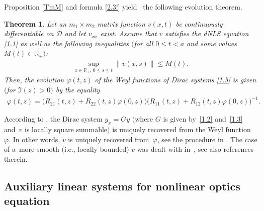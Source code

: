 \documentclass[pdftex]{sigma}
\newtheorem{Theorem}{Theorem}[section]
\def\vp{\varphi}
\def\BR{{\mathbb R}}
\newcommand{\cD}{{\mathcal D}}
\numberwithin{equation}{section}
\begin{document}
Proposition \ref{TmM} and formula \eqref{2.3!} yield~\cite{Sa14b} the following evolution theorem.
 \begin{Theorem}\label{evol} Let an $m_1 \times m_2$ matrix function $v(x,t)$
 be continuously differentiable on $\cD$
 and let $v_{xx}$ exist.
 Assume that $v$ satisfies the dNLS equation \eqref{1.1} as well as the following inequalities
 $($for all $0 \leq t<a$ and some values $M(t)\in \BR_+)$:
 \begin{gather} \label{2.7}
 \sup_{x \in \BR_+, \, 0\leq s \leq t}\|v(x,s)\| \leq M(t).
\end{gather}
 Then, the evolution $\vp(t,z)$ of the Weyl functions of Dirac systems \eqref{1.5} is given $($for $\Im(z)>0)$ by the equality
 \begin{gather*} %
\vp(t,z)=\big(R_{21}(t,z)+R_{22}(t,z)\vp(0,z)\big)
\big(R_{11}(t,z)+R_{12}(t,z)\vp(0,z)\big)^{-1}.
\end{gather*}
\end{Theorem}

\begin{Remark}\label{RkInvPr} According to \cite{Sa14}, the Dirac system $y_x=Gy$ $($where $G$ is given by~\eqref{1.2} and~\eqref{1.3}
and~$v$ is locally square summable$)$
is uniquely recovered from the Weyl function $\vp$. In other words, $v$ is uniquely recovered from~$\vp$, see the procedure in \cite[Theorem~4.4]{Sa14}.
The case of a~more smooth $($i.e., locally bounded$)$ $v$ was dealt with in~\cite{SaSaR}, see also references therein.
\end{Remark}

\subsection{Auxiliary linear systems for nonlinear optics equation}\label{subs2.2}
\end{document}
